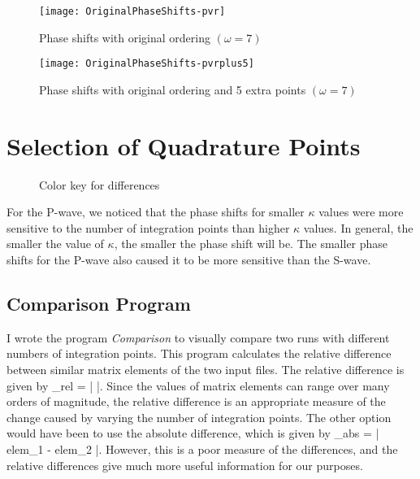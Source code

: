 \documentclass[Dissertation.tex]{subfiles}
\begin{document}
\begin{figure}
	\centering
	\texttt{[image: OriginalPhaseShifts-pvr]}
	\caption{Phase shifts with original ordering $(\omega = 7)$}
	\label{fig:OriginalPhaseShifts-pvr}
\end{figure}

\begin{figure}
	\centering
	\texttt{[image: OriginalPhaseShifts-pvrplus5]}
	\caption{Phase shifts with original ordering and 5 extra points $(\omega = 7)$}
	\label{fig:OriginalPhaseShifts-pvrplus5}
\end{figure}



\section{Selection of Quadrature Points}
\label{sec:SelQuadPoints2}

\begin{figure}
	\caption{Color key for differences}
	\label{fig:ColorKey}
\end{figure}

For the P-wave, we noticed that the phase shifts for smaller $\kappa$ values were more sensitive to the number of integration points than higher $\kappa$ values. In general, the smaller the value of $\kappa$, the smaller the phase shift will be. The smaller phase shifts for the P-wave also caused it to be more sensitive than the S-wave.

\subsection{Comparison Program}
I wrote the program \emph{Comparison} \cite{} to visually compare two runs with different numbers of integration points. This program calculates the relative difference between similar matrix elements of the two input files. The relative difference is given by
\beq
{}_{rel} = \left|  \right|.
\eeq
Since the values of matrix elements can range over many orders of magnitude, the relative difference is an appropriate measure of the change caused by varying the number of integration points. The other option would have been to use the absolute difference, which is given by 
\beq
{}_{abs} = \left| elem_1 - elem_2 \right|.
\eeq
However, this is a poor measure of the differences, and the relative differences give much more useful information for our purposes.
\end{document}
